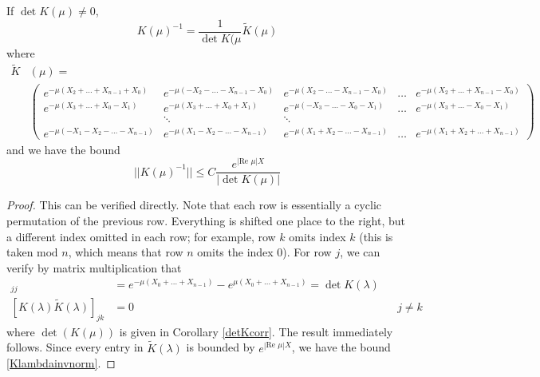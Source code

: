 \documentclass[thesis.tex]{subfiles}
\begin{document}
\begin{lemma}\label{Kinvlemma}
If $\det K(\mu) \neq 0$,
\begin{equation}\label{Klambdainv}
K(\mu)^{-1} = \frac{1}{\det K(\mu} \tilde{K}(\mu)
\end{equation}
where
\begin{align}\label{tildeK}
\tilde{K}&(\mu) = \\
&\begin{pmatrix}
e^{-\mu(X_2+\dots+X_{n-1}+X_0)} & e^{-\mu(-X_2-\dots-X_{n-1}-X_0)} &
e^{-\mu(X_2-\dots-X_{n-1}-X_0)} & \dots & e^{-\mu(X_2+\dots+X_{n-1}-X_0)}  \\ 
e^{-\mu(X_3+\dots+X_0-X_1)} & e^{-\mu(X_3+\dots+X_0+X_1)} &
e^{-\mu(-X_3-\dots-X_0-X_1)} & \dots & e^{-\mu(X_3+\dots-X_0-X_1)} \\ 
& \ddots & \ddots \\
e^{-\mu(-X_1-X_2 -\dots-X_{n-1})} & e^{-\mu(X_1-X_2 -\dots-X_{n-1})} &
e^{-\mu(X_1+X_2 -\dots-X_{n-1})} & \dots & e^{-\mu(X_1+X_2+\dots+X_{n-1})}  \nonumber 
\end{pmatrix}
\end{align}
and we have the bound
\begin{equation}\label{Klambdainvnorm}
||K(\mu)^{-1}|| \leq C \frac{e^{|\text{Re }\mu|X }}{| \det K(\mu) |}
\end{equation}

\begin{proof}
This can be verified directly. Note that each row is essentially a cyclic permutation of the previous row. Everything is shifted one place to the right, but a different index omitted in each row; for example, row $k$ omits index $k$ (this is taken $\text{mod } n$, which means that row $n$ omits the index 0). For row $j$, we can verify by matrix multiplication that
\begin{align*}
[K(\lambda)\tilde{K}(\lambda)]_{jj} &= e^{-\mu(X_0 + \dots + X_{n-1})} - e^{\mu(X_0 + \dots + X_{n-1})} = \det K(\lambda) \\
[K(\lambda)\tilde{K}(\lambda)]_{jk} &= 0 && j \neq k
\end{align*}
where $\det(K(\mu))$ is given in Corollary \ref{detKcorr}. The result immediately follows. Since every entry in $\tilde{K}(\lambda)$ is bounded by $e^{|\text{Re }\mu|X }$, we have the bound \cref{Klambdainvnorm}.
\end{proof}
\end{lemma}
\end{document}
